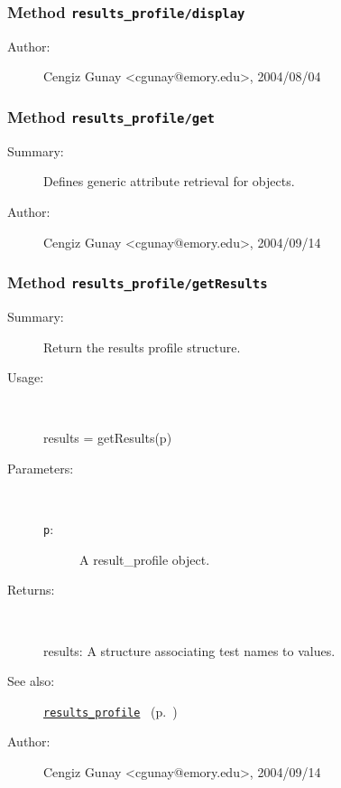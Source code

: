 \subsubsection[Method \texttt{display}]{Method \texttt{results\_profile/display}}%
%
\label{ref_results_profile__display}%
\hypertarget{ref_results_profile__display}{}%
\begin{description}
%
%
%
%
%
%
%
\item[Author:]%
Cengiz Gunay <cgunay@emory.edu>, 2004/08/04
%
\end{description}
\methodline%
\subsubsection[Method \texttt{get}]{Method \texttt{results\_profile/get}}%
%
\label{ref_results_profile__get}%
\hypertarget{ref_results_profile__get}{}%
\begin{description}
\item[Summary:]Defines generic attribute retrieval for objects.
%
%
%
%
%
%
%
\item[Author:]%
Cengiz Gunay <cgunay@emory.edu>, 2004/09/14
%
\end{description}
\methodline%
\subsubsection[Method \texttt{getResults}]{Method \texttt{results\_profile/getResults}}%
%
\label{ref_results_profile__getResults}%
\hypertarget{ref_results_profile__getResults}{}%
\begin{description}
\item[Summary:]Return the results profile structure.
%
\item[Usage:]~%
\begin{lyxcode}%
results = getResults(p)
%
\end{lyxcode}%
%
%
\item[Parameters:]~
\begin{description}%
\item[\texttt{p}:]
 A result\_profile object.
\end{description}%
%
\item[Returns:
]~

	results: A structure associating test names to values.
%
%
\item[See also:]%
\hyperlink{ref_results_profile}{\texttt{results\_profile}}%
\ (p.~\pageref{ref_results_profile})%
%
%
\item[Author:]%
Cengiz Gunay <cgunay@emory.edu>, 2004/09/14
%
\end{description}
\methodline%
